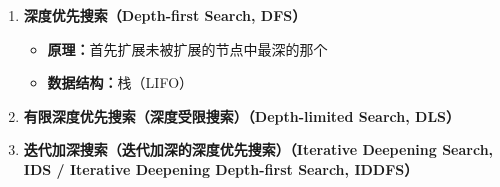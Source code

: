 \documentclass[../main.tex]{subfiles}
\begin{document}
\begin{enumerate}
{\begin{itemize}
\begin{itemize}
        \item \textbf{第2步：}取出队首 $D(2)$，$D$ 不是目标，加入 explored，并扩展其后继 $C$：
        \[
        frontier=[B(3),\,C(8)],\qquad explored=\{A,D\}
        \]

        \item \textbf{第3步：}取出队首 $B(3)$，$B$ 不是目标，加入 explored，并扩展其后继 $E$：
        \[
        frontier=[E(5),\,C(8)],\qquad explored=\{A,D,B\}
        \]

        \item \textbf{第4步：}取出队首 $E(5)$，$E$ 不是目标，加入 explored，并扩展其后继 $C$。此时新路径
        \[
        A\to B\to E\to C
        \]
        的代价为
        \[
        3+2+2=7
        \]
        而 frontier 中原有 $C(8)$，由于 $7<8$，因此用更优的 $C(7)$ 替换原来的 $C(8)$：
        \[
        frontier=[C(7)],\qquad explored=\{A,D,B,E\}
        \]

        \item \textbf{第5步：}取出队首 $C(7)$，发现 $C$ 是目标，搜索成功：
        \[
        frontier=\varnothing,\qquad explored=\{A,D,B,E,C\}
        \]

        \item \textbf{最优路径：}
        \[
        A\to B\to E\to C
        \]
        \item \textbf{路径代价：}
        \[
        3+2+2=7
        \]
    \end{itemize}
\end{itemize}
    }
    \item \textbf{深度优先搜索（Depth-first Search, DFS）}
    \begin{itemize}
        \item \textbf{原理：}首先扩展未被扩展的节点中最深的那个
        \item \textbf{数据结构：}栈（LIFO）
    \end{itemize}
    \item \textbf{有限深度优先搜索（深度受限搜索）（Depth-limited Search, DLS）}
    \item \textbf{迭代加深搜索（迭代加深的深度优先搜索）（Iterative Deepening Search, IDS / Iterative Deepening Depth-first Search, IDDFS）}
\end{enumerate}
\end{document}
